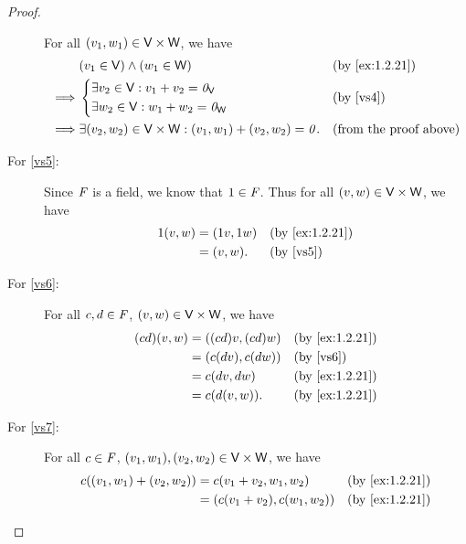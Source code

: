 \begin{proof}
\begin{description}
			For all \(\left\lparen v_{1}, w_{1}\right\rparen \in \mathsf{V} \times \mathsf{W}\), we have
			\begin{align*}
				         & \p{v_{1} \in \V} \land \p{w_{1} \in \W}                                                &  & \text{(by \cref{ex:1.2.21})}  \\
				\implies & \begin{dcases}
					\exists v_{2} \in \V : v_{1} + v_{2} = \zv_{\V} \\
					\exists w_{2} \in \V : w_{1} + w_{2} = \zv_{\W}
				\end{dcases}                                                             &  & \text{(by \ref{vs4})}         \\
				\implies & \exists \p{v_{2}, w_{2}} \in \V \times \W : \p{v_{1}, w_{1}} + \p{v_{2}, w_{2}} = \zv. &  & \text{(from the proof above)}
			\end{align*}
		\item[For \ref{vs5}:]
			Since \(\mathit{F}\) is a field, we know that \(1 \in \mathit{F}\).
			Thus for all \(\left\lparen v, w\right\rparen \in \mathsf{V} \times \mathsf{W}\), we have
			\begin{align*}
				1\p{v, w} & = \p{1v, 1w} &  & \text{(by \cref{ex:1.2.21})} \\
				          & = \p{v, w}.  &  & \text{(by \ref{vs5})}
			\end{align*}
		\item[For \ref{vs6}:]
			For all \(c, d \in \mathit{F}\), \(\left\lparen v, w\right\rparen \in \mathsf{V} \times \mathsf{W}\), we have
			\begin{align*}
				\p{cd} \p{v, w} & = \p{\p{cd} v, \p{cd} w} &  & \text{(by \cref{ex:1.2.21})} \\
				                & = \p{c\p{dv}, c\p{dw}}   &  & \text{(by \ref{vs6})}        \\
				                & = c \p{dv, dw}           &  & \text{(by \cref{ex:1.2.21})} \\
				                & = c\p{d\p{v, w}}.        &  & \text{(by \cref{ex:1.2.21})}
			\end{align*}
		\item[For \ref{vs7}:]
			For all \(c \in \mathit{F}\), \(\p{v_{1}, w_{1}}, \p{v_{2}, w_{2}} \in \V \times \W\), we have
			\begin{align*}
				c \p{\p{v_{1}, w_{1}} + \p{v_{2}, w_{2}}} & = c \p{v_{1} + v_{2}, w_{1}, w_{2}}         &  & \text{(by \cref{ex:1.2.21})} \\
				                                          & = \p{c\p{v_{1} + v_{2}}, c\p{w_{1}, w_{2}}} &  & \text{(by \cref{ex:1.2.21})} \\

\end{align*}
\end{description}
\end{proof}
